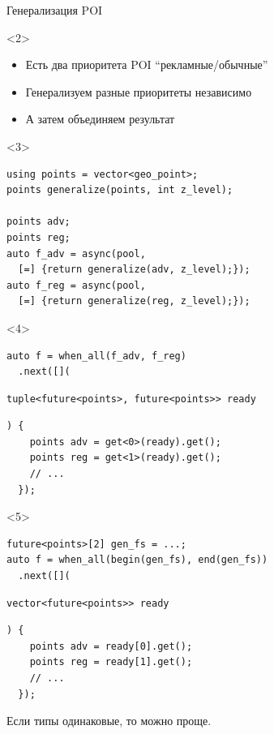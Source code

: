 \documentclass[aspectratio=169,hyperref={unicode},17pt]{beamer}
\begin{document}
\begin{frame}[fragile,t]{Генерализация POI}
\begin{onlyenv}<2>
\begin{itemize}
 \item Есть два приоритета POI ``рекламные/обычные''
 \item Генерализуем разные приоритеты независимо
 \item А затем объединяем результат
\end{itemize}
\end{onlyenv}
\begin{onlyenv}<3>
\begin{lstlisting}[style=cppcode]
using points = vector<geo_point>;
points generalize(points, int z_level);

points adv;
points reg;
auto f_adv = async(pool,
  [=] {return generalize(adv, z_level);});
auto f_reg = async(pool,
  [=] {return generalize(reg, z_level);});
\end{lstlisting}
\end{onlyenv}
\begin{onlyenv}<4>
\begin{lstlisting}[style=cppcode,aboveskip=0pt,belowskip=0pt]
auto f = when_all(f_adv, f_reg)
  .next([](
\end{lstlisting}
\begin{lstlisting}[style=cppcode,backgroundcolor=\color{gray!30},aboveskip=0pt,belowskip=0pt]
    tuple<future<points>, future<points>> ready
\end{lstlisting}
\begin{lstlisting}[style=cppcode,aboveskip=0pt,belowskip=0pt]
  ) {
    points adv = get<0>(ready).get();
    points reg = get<1>(ready).get();
    // ...
  });
\end{lstlisting}
\end{onlyenv}
\begin{onlyenv}<5>
\begin{lstlisting}[style=cppcode,aboveskip=0pt,belowskip=0pt]
future<points>[2] gen_fs = ...;
auto f = when_all(begin(gen_fs), end(gen_fs))
  .next([](
\end{lstlisting}
\begin{lstlisting}[style=cppcode,backgroundcolor=\color{gray!30},aboveskip=0pt,belowskip=0pt]
    vector<future<points>> ready
\end{lstlisting}
\begin{lstlisting}[style=cppcode,aboveskip=0pt,belowskip=0pt]
  ) {
    points adv = ready[0].get();
    points reg = ready[1].get();
    // ...
  });
\end{lstlisting}
Если типы одинаковые, то можно проще.
\end{onlyenv}
\end{frame}
\end{document}
